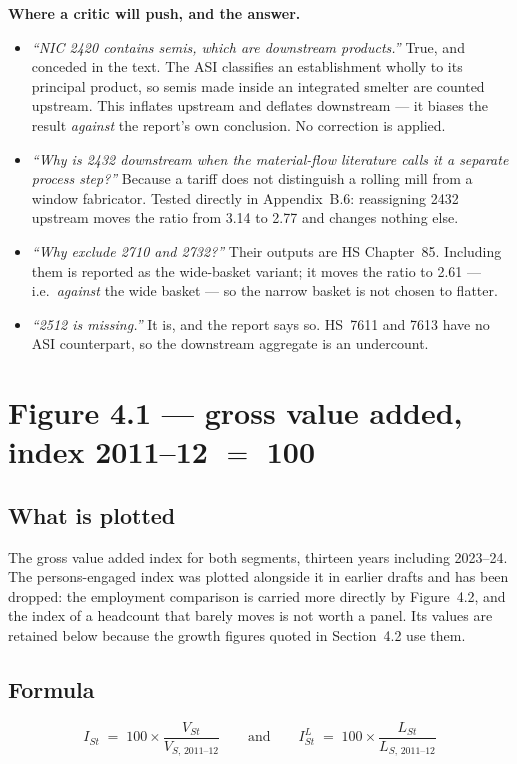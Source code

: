 \documentclass[11pt, a4paper]{article}
\begin{document}
\begin{caution}
\textbf{Where a critic will push, and the answer.}
\begin{itemize}[leftmargin=1.2em, itemsep=2pt]
\item \emph{``NIC 2420 contains semis, which are downstream products.''} True, and
conceded in the text. The ASI classifies an establishment wholly to its principal
product, so semis made inside an integrated smelter are counted upstream. This
inflates upstream and deflates downstream --- it biases the result \emph{against} the
report's own conclusion. No correction is applied.
\item \emph{``Why is 2432 downstream when the material-flow literature calls it a
separate process step?''} Because a tariff does not distinguish a rolling mill from a
window fabricator. Tested directly in Appendix~B.6: reassigning 2432 upstream moves
the ratio from 3.14 to 2.77 and changes nothing else.
\item \emph{``Why exclude 2710 and 2732?''} Their outputs are HS Chapter~85. Including
them is reported as the wide-basket variant; it moves the ratio to 2.61 --- i.e.\
\emph{against} the wide basket --- so the narrow basket is not chosen to flatter.
\item \emph{``2512 is missing.''} It is, and the report says so. HS~7611 and 7613 have
no ASI counterpart, so the downstream aggregate is an undercount.
\end{itemize}
\end{caution}

\section{Figure 4.1 --- gross value added, index 2011--12 $=$ 100}

\subsection{What is plotted}

The gross value added index for both segments, thirteen years including 2023--24.
The persons-engaged index was plotted alongside it in earlier drafts and has been
dropped: the employment comparison is carried more directly by Figure~4.2, and the
index of a headcount that barely moves is not worth a panel. Its values are
retained below because the growth figures quoted in Section~4.2 use them.

\subsection{Formula}
\[
I_{St} \;=\; 100 \times \frac{V_{St}}{V_{S,\,2011\text{--}12}}
\qquad\text{and}\qquad
I^{L}_{St} \;=\; 100 \times \frac{L_{St}}{L_{S,\,2011\text{--}12}}
\]
\end{document}
